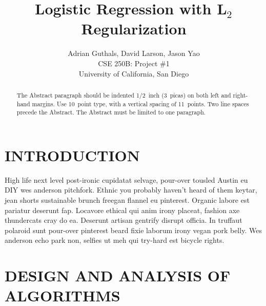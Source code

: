 
\title{Logistic Regression with L$_2$ Regularization}

\author{Adrian Guthals, David Larson, Jason Yao \\
CSE 250B: Project \#1 \\
University of California, San Diego \\
}




\maketitle


\begin{abstract}
The Abstract paragraph should be indented 1/2~inch (3~picas) on
both left and right-hand margins. Use 10~point type, with a
vertical spacing of 11~points. Two line spaces precede the Abstract.
The Abstract must be limited to one paragraph.
\end{abstract}





\section{INTRODUCTION}
\label{sec:intro}

High life next level post-ironic cupidatat selvage, pour-over tousled Austin eu DIY wes anderson pitchfork. Ethnic you probably haven't heard of them keytar, jean shorts sustainable brunch freegan flannel eu pinterest. Organic labore est pariatur deserunt fap. Locavore ethical qui anim irony placeat, fashion axe thundercats cray do ea. Deserunt artisan gentrify disrupt officia. In truffaut polaroid sunt pour-over pinterest beard fixie laborum irony vegan pork belly. Wes anderson echo park non, selfies ut meh qui try-hard est bicycle rights.



\section{DESIGN AND ANALYSIS OF ALGORITHMS}
\label{sec:algorithms}


